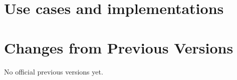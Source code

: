 \documentclass[11pt,a4paper]{ivoa}
\begin{document}
\section{Use cases and implementations}\label{sec:usecases-implementations}



\appendix
\section{Changes from Previous Versions}
No official previous versions yet.



\end{document}
